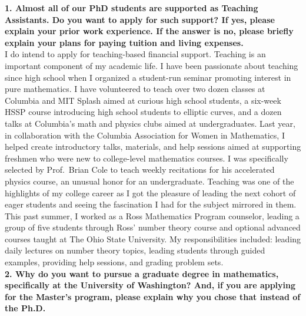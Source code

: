 \documentclass[11pt]{article}
\begin{document}
\noindent \textbf{1. Almost all of our PhD students are supported as Teaching Assistants. Do you want to apply for such support? If yes, please explain your prior work experience. If the answer is no, please briefly explain your plans for paying tuition and living expenses.}
\bigskip\\
I do intend to apply for teaching-based financial support. Teaching is an important component of my academic life. I have been passionate about teaching since high school when I organized a student-run seminar promoting interest in pure mathematics. I have volunteered to teach over two dozen classes at Columbia and MIT Splash aimed at curious high school students, a six-week HSSP course introducing high school students to elliptic curves, and a dozen talks at Columbia's math and physics clubs aimed at undergraduates. Last year, in collaboration with the Columbia Association for Women in Mathematics, I helped create introductory talks, materials, and help sessions aimed at supporting freshmen who were new to college-level mathematics courses. I was specifically selected by Prof.\ Brian Cole to teach weekly recitations for his accelerated physics course, an unusual honor for an undergraduate. Teaching was one of the highlights of my college career as I got the pleasure of leading the next cohort of eager students and seeing the fascination I had for the subject mirrored in them. This past summer, I worked as a Ross Mathematics Program counselor, leading a group of five students through Ross’ number theory course and optional advanced courses taught at The Ohio State University. My responsibilities included: leading daily lectures on number theory topics, leading students through guided examples, providing help sessions, and grading problem sets.
\bigskip\\
\noindent\textbf{2. Why do you want to pursue a graduate degree in mathematics, specifically at the University of Washington? And, if you are applying for the Master’s program, please explain why you chose that instead of the Ph.D.}
\bigskip\\
\end{document}
